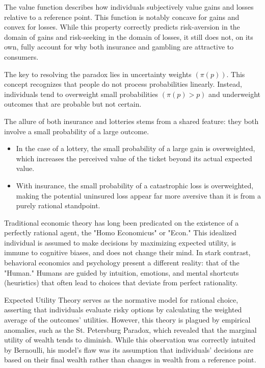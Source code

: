 \documentclass{article}
\begin{document}
The value function describes how individuals subjectively value gains and losses relative to a reference point. This function is notably concave for gains and convex for losses. While this property correctly predicts risk-aversion in the domain of gains and risk-seeking in the domain of losses, it still does not, on its own, fully account for why both insurance and gambling are attractive to consumers.


The key to resolving the paradox lies in uncertainty weights $(\pi(p))$. This concept recognizes that people do not process probabilities linearly. Instead, individuals tend to overweight small probabilities $(\pi(p)>p)$ and underweight outcomes that are probable but not certain.

The allure of both insurance and lotteries stems from a shared feature: they both involve a small probability of a large outcome.
\begin{itemize}
\item In the case of a lottery, the small probability of a large gain is overweighted, which increases the perceived value of the ticket beyond its actual expected value.
\item With insurance, the small probability of a catastrophic loss is overweighted, making the potential uninsured loss appear far more aversive than it is from a purely rational standpoint.
\end{itemize}


Traditional economic theory has long been predicated on the existence of a perfectly rational agent, the "Homo Economicus" or "Econ." This idealized individual is assumed to make decisions by maximizing expected utility, is immune to cognitive biases, and does not change their mind. In stark contrast, behavioral economics and psychology present a different reality: that of the "Human." Humans are guided by intuition, emotions, and mental shortcuts (heuristics) that often lead to choices that deviate from perfect rationality.

Expected Utility Theory serves as the normative model for rational choice, asserting that individuals evaluate risky options by calculating the weighted average of the outcomes' utilities. However, this theory is plagued by empirical anomalies, such as the St. Petersburg Paradox, which revealed that the marginal utility of wealth tends to diminish. While this observation was correctly intuited by Bernoulli, his model's flaw was its assumption that individuals' decisions are based on their final wealth rather than changes in wealth from a reference point.
\end{document}
